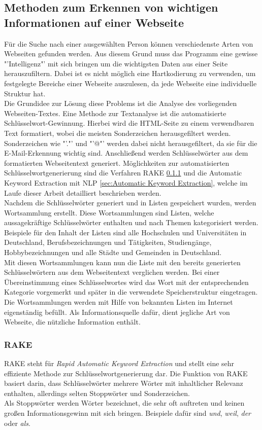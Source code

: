 	\subsection{Methoden zum Erkennen von wichtigen Informationen auf einer Webseite}
	\label{subsec:ErkennenVonInformation}
	Für die Suche nach einer ausgewählten Person können verschiedenste Arten von Webseiten gefunden werden. Aus diesem Grund muss das Programm eine gewisse "'Intelligenz"' mit sich bringen um die wichtigsten Daten aus einer Seite herauszufiltern. Dabei ist es nicht möglich eine Hartkodierung zu verwenden, um festgelegte Bereiche einer Webseite auszulesen, da jede Webseite eine individuelle Struktur hat.\\
	Die Grundidee zur Lösung diese Problems ist die Analyse des vorliegenden Webseiten-Textes. Eine Methode zur Textanalyse ist die automatisierte Schlüsselwort-Gewinnung. Hierbei wird die HTML-Seite zu einem verwendbaren Text formatiert, wobei die meisten Sonderzeichen herausgefiltert werden. Sonderzeichen wie "'."' und "'@"' werden dabei nicht herausgefiltert, da sie für die E-Mail-Erkennung wichtig sind. Anschließend werden Schlüsselwörter aus dem formatierten Webseitentext generiert. Möglichkeiten zur automatisierten Schlüsselwortgenerierung sind die Verfahren RAKE \ref{sec:RAKE} und die Automatic Keyword Extraction mit NLP \ref{sec:Automatic Keyword Extraction}, welche im Laufe dieser Arbeit detailliert beschrieben werden.\\
	Nachdem die Schlüsselwörter generiert und in Listen gespeichert wurden, werden Wortsammlung erstellt. Diese Wortsammlungen sind Listen, welche aussagekräftige Schlüsselwörter enthalten und nach Themen kategorisiert werden. Beispiele für den Inhalt der Listen sind alle Hochschulen und Universitäten in Deutschland, Berufsbezeichnungen und Tätigkeiten, Studiengänge, Hobbybezeichnungen und alle Städte und Gemeinden in Deutschland.\\
	Mit diesen Wortsammlungen kann nun die Liste mit den bereits generierten Schlüsselwörtern aus dem Webseitentext verglichen werden. Bei einer Übereinstimmung eines Schlüsselwortes wird das Wort mit der entsprechenden Kategorie vorgemerkt und später in die verwendete Speicherstruktur eingetragen. \\
	Die Wortsammlungen werden mit Hilfe von bekannten Listen im Internet eigenständig befüllt. Als Informationsquelle dafür, dient jegliche Art von Webseite, die nützliche Information enthält.	
		\subsubsection{RAKE}
		\label{sec:RAKE}
		RAKE steht für \textit{Rapid Automatic Keyword Extraction} und stellt eine sehr effiziente Methode zur Schlüsselwortgenerierung dar. Die Funktion von RAKE basiert darin, dass Schlüsselwörter mehrere Wörter mit inhaltlicher Relevanz enthalten, allerdings selten Stoppwörter und Sonderzeichen.\cite{rose2010automatic}\\
		Als Stoppwörter werden Wörter bezeichnet, die sehr oft auftreten und keinen großen Informationsgewinn mit sich bringen. Beispiele dafür sind \textit{und}, \textit{weil}, \textit{der} oder \textit{als}.\cite{Stopwords}\\
		
